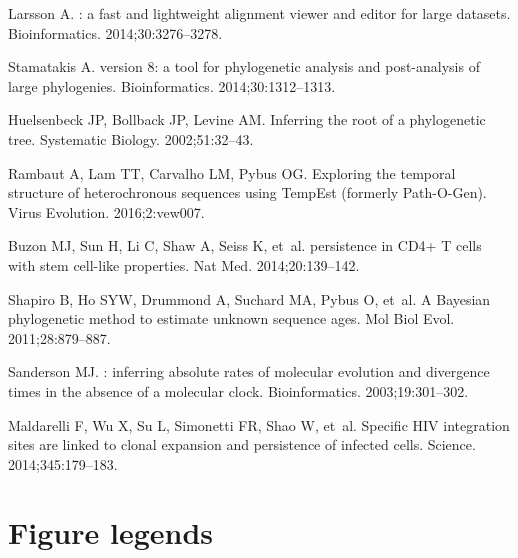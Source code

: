 \documentclass{bmcart}
\begin{document}
\begin{backmatter}
\begin{thebibliography}{10}
Larsson A.
: a fast and lightweight alignment viewer and editor for
  large datasets.
\newblock Bioinformatics. 2014;\hspace{0pt}30:3276--3278.

Stamatakis A.
 version 8: a tool for phylogenetic analysis and post-analysis
  of large phylogenies.
\newblock Bioinformatics. 2014;\hspace{0pt}30:1312--1313.

Huelsenbeck JP, Bollback JP, Levine AM.
\newblock Inferring the root of a phylogenetic tree.
\newblock Systematic Biology. 2002;\hspace{0pt}51:32--43.

Rambaut A, Lam TT, Carvalho LM, Pybus OG.
\newblock Exploring the temporal structure of heterochronous sequences using
  {TempEst} (formerly {Path-O-Gen}).
\newblock Virus Evolution. 2016;\hspace{0pt}2:vew007.

Buzon MJ, Sun H, Li C, Shaw A, Seiss K, et~al.
 persistence in {CD4+} {T} cells with stem cell-like
  properties.
\newblock Nat Med. 2014;\hspace{0pt}20:139--142.

Shapiro B, Ho SYW, Drummond A, Suchard MA, Pybus O, et~al.
\newblock A {Bayesian} phylogenetic method to estimate unknown sequence ages.
\newblock Mol Biol Evol. 2011;\hspace{0pt}28:879--887.

Sanderson MJ.
: inferring absolute rates of molecular evolution and divergence
  times in the absence of a molecular clock.
\newblock Bioinformatics. 2003;\hspace{0pt}19:301--302.

Maldarelli F, Wu X, Su L, Simonetti FR, Shao W, et~al.
\newblock Specific {HIV} integration sites are linked to clonal expansion and
  persistence of infected cells.
\newblock Science. 2014;\hspace{0pt}345:179--183.

\end{thebibliography}




\section * {Figure legends}


\end{backmatter}
\end{document}
